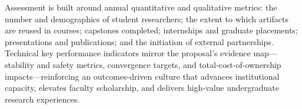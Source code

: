 \documentclass[12pt]{article}
\begin{document}
Assessment is built around annual quantitative and qualitative metrics: the number and demographics of student researchers; the extent to which artifacts are reused in courses; capstones completed; internships and graduate placements; presentations and publications; and the initiation of external partnerships. Technical key performance indicators mirror the proposal's evidence map—stability and safety metrics, convergence targets, and total-cost-of-ownership impacts—reinforcing an outcomes-driven culture that advances institutional capacity, elevates faculty scholarship, and delivers high-value undergraduate research experiences.
\end{document}
